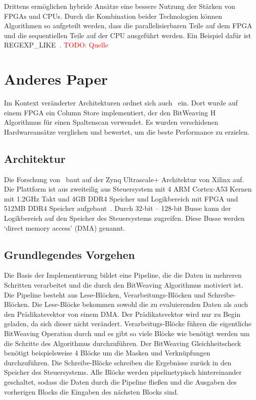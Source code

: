 \documentclass[conference]{IEEEtran}
\newcommand{\todo}[1]{\textcolor{red}{TODO: #1}}
\begin{document}
Drittens ermöglichen hybride Ansätze eine bessere Nutzung der Stärken von FPGAs und CPUs. Durch die Kombination beider Technologien
können Algorithmen so aufgeteilt werden, dass die parallelisierbaren Teile auf dem FPGA und die sequentiellen Teile auf der CPU ausgeführt werden. Ein Beispiel dafür ist
REGEXP\_LIKE~\cite{sidler_accelerating_2017}.
\todo{Quelle}


\section{Anderes Paper} %
Im Kontext veränderter Architekturen ordnet sich auch~\cite{lisa_column_2018} ein. Dort wurde auf einem FPGA ein Column Store implementiert, der
den BitWeaving H Algorithmus für einen Spaltenscan verwendet. Es wurden verschidenen Hardwareansätze verglichen und bewertet, um die beste Performance zu erzielen.

\subsection{Architektur}
Die Forschung von~\cite{lisa_column_2018} baut auf der Zynq Ultrascale+ Architektur von Xilinx auf. Die Plattform ist aus zweiteilig aus Steuersystem mit
4 ARM Cortex-A53 Kernen mit 1.2GHz Takt und 4GB DDR4 Speicher und Logikbereich mit FPGA und 512MB DDR4 Speicher aufgebaut~\cite{lisa_column_2018}.
Durch 32-bit -- 128-bit Busse kann der Logikbereich auf den Speicher des Steuersystems zugreifen. Diese Busse werden `direct memory access' (DMA) genannt.

\subsection{Grundlegendes Vorgehen}
Die Basis der Implementierung bildet eine Pipeline, die die Daten in mehreren Schritten verarbeitet und die durch den BitWeaving Algorithmus motiviert ist. Die Pipeline besteht aus Lese-Blöcken,
Verarbeitungs-Blöcken und Schreibe-Blöcken. Die Lese-Blöcke bekommen sowohl die zu evaluierenden Daten als auch den Prädikatsvektor von einem DMA\@.
Der Prädikatsvektor wird nur zu Begin geladen, da sich dieser nicht verändert.
Verarbeitugs-Blöcke führen die eigentliche BitWeaving Operation durch und es gibt so viele Blöcke wie benötigt werden um die Schritte des Algorithmus durchzuführen.
Der BitWeaving Gleichheitscheck benötigt beispielsweise 4 Blöcke um die Masken und Verknüpfungen durchzuführen. Die Schreibe-Blöcke schreiben die Ergebnisse zurück in den
Speicher des Steuersystems. Alle Blöcke werden pipelinetypisch hintereinander geschaltet, sodass die Daten durch die Pipeline fließen und die Ausgaben des vorherigen Blocks die Eingaben des nächsten Blocks sind.
\end{document}
